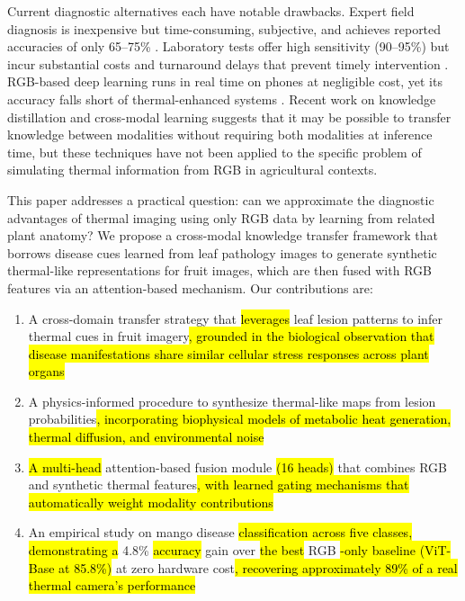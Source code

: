\documentclass[utf8]{FrontiersinHarvard}
\newenvironment{revblock}{}{}
\begin{document}
\begin{revblock}
Current diagnostic alternatives each have notable drawbacks. Expert field diagnosis is inexpensive but time-consuming, subjective, and achieves reported accuracies of only 65--75\% \cite{ferentinos2018}. Laboratory tests offer high sensitivity (90--95\%) but incur substantial costs and turnaround delays that prevent timely intervention \cite{martinelli2015}. RGB-based deep learning runs in real time on phones at negligible cost, yet its accuracy falls short of thermal-enhanced systems \cite{mohanty2016,hasan2024}. Recent work on knowledge distillation \cite{hinton2015,li2023_kd} and cross-modal learning \cite{xu2023} suggests that it may be possible to transfer knowledge between modalities without requiring both modalities at inference time, but these techniques have not been applied to the specific problem of simulating thermal information from RGB in agricultural contexts.
\end{revblock}

This paper addresses a practical question: can we approximate the diagnostic advantages of thermal imaging using only RGB data by learning from related plant anatomy? We propose a cross-modal knowledge transfer framework that borrows disease cues learned from leaf pathology images to generate synthetic thermal-like representations for fruit images, which are then fused with RGB features via an attention-based mechanism. Our contributions are:

\begin{enumerate}
    \item A cross-domain transfer strategy that \hl{leverages} leaf lesion patterns to infer thermal cues in fruit imagery\hl{, grounded in the biological observation that disease manifestations share similar cellular stress responses across plant organs}
    \item A physics-informed procedure to synthesize thermal-like maps from lesion probabilities\hl{, incorporating biophysical models of metabolic heat generation, thermal diffusion, and environmental noise}
    \item \hl{A multi-head} attention-based fusion module \hl{(16 heads)} that combines RGB and synthetic thermal features\hl{, with learned gating mechanisms that automatically weight modality contributions}
    \item An empirical study on mango disease \hl{classification across five classes, demonstrating a} 4.8\% \hl{accuracy} gain over \hl{the best} RGB \hl{-only baseline (ViT-Base at 85.8\%)} at zero hardware cost\hl{, recovering approximately 89\% of a real thermal camera's performance}
\end{enumerate}
\end{document}
